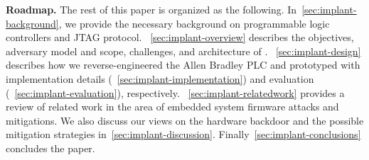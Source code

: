 
\textbf{Roadmap.} The rest of this paper is organized as the following. In~\autoref{sec:implant-background}, we provide the necessary background on programmable logic controllers and JTAG protocol. ~\autoref{sec:implant-overview} describes the objectives, adversary model and scope, challenges, and architecture of \name. ~\autoref{sec:implant-design} describes how we reverse-engineered the Allen Bradley PLC and prototyped \name with implementation details (~\autoref{sec:implant-implementation}) and evaluation (~\autoref{sec:implant-evaluation}), respectively. ~\autoref{sec:implant-relatedwork} provides a review of related work in the area of embedded system firmware attacks and mitigations. We also discuss our views on the hardware backdoor and the possible mitigation strategies in~\autoref{sec:implant-discussion}. Finally~\autoref{sec:implant-conclusions} concludes the paper.


